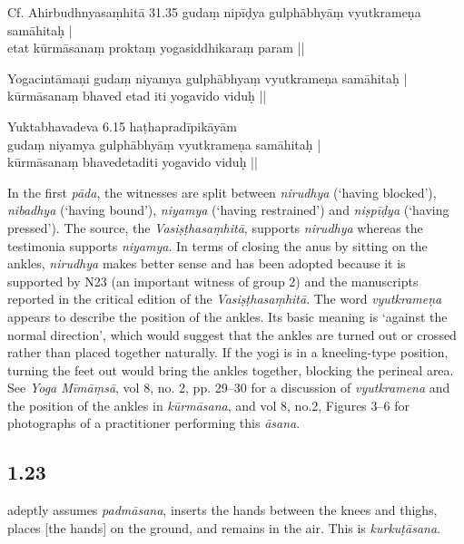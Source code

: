 \begin{ekdosis}
\begin{sources}[hp01_022]
Cf. Ahirbudhnyasaṃhitā 31.35
\startverse
gudaṃ nipīḍya gulphābhyāṃ vyutkrameṇa samāhitaḥ |\\
etat kūrmāsanaṃ proktaṃ yogasiddhikaraṃ param || 
\endverse
\end{sources}

\begin{testimonia}[hp01_022]
Yogacintāmaṇi
\startverse
gudaṃ niyamya gulphābhyaṃ vyutkrameṇa samāhitaḥ |\\
kūrmāsanaṃ bhaved etad iti yogavido viduḥ ||
\endverse

Yuktabhavadeva 6.15
\startverse
haṭhapradīpikāyām\\
gudaṃ niyamya gulphābhyāṃ vyutkrameṇa samāhitaḥ |\\
kūrmāsanaṃ bhavedetaditi yogavido viduḥ ||
\endverse

\end{testimonia}

\begin{philcomm}[hp01_022]   
In the first \emph{pāda}, the witnesses are split between \emph{nirudhya} (‘having blocked’), \emph{nibadhya} (‘having bound’), \emph{niyamya} (‘having restrained’) and \emph{niṣpīḍya} (‘having pressed’). The source, the \emph{Vasiṣṭhasaṃhitā}, supports \emph{nirudhya} whereas the testimonia supports \emph{niyamya}. In terms of closing the anus by sitting on the ankles, \emph{nirudhya} makes better sense and has been adopted because it is supported by N23 (an important witness of group 2) and the manuscripts reported in the critical edition of the \emph{Vasiṣṭhasaṃhitā}. The word \emph{vyutkrameṇa} appears to describe the position of the ankles. Its basic meaning is ‘against the normal direction’, which would suggest that the ankles are turned out or crossed rather than placed together naturally. If the yogi is in a kneeling-type position, turning the feet out would bring the ankles together, blocking the perineal area. See \emph{Yoga Mīmāṃsā}, vol 8, no. 2, pp. 29–30 for a discussion of \emph{vyutkramena} and the position of the ankles in \emph{kūrmāsana}, and vol 8, no.2, Figures 3–6 for photographs of a practitioner performing this \emph{āsana}. 
\end{philcomm}

\subsection*{1.23}
\begin{translation} adeptly assumes \emph{padmāsana}, inserts the hands between the knees and thighs, places [the hands] on the ground, and remains in the air. This is \emph{kurkuṭāsana}.
\end{translation}


\end{ekdosis}
